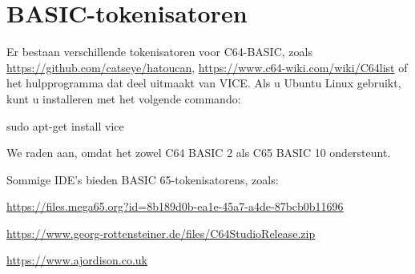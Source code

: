 \chapter{BASIC-tokenisatoren}

Er bestaan verschillende tokenisatoren voor C64-BASIC, zoals \url{https://github.com/catseye/hatoucan},
\url{https://www.c64-wiki.com/wiki/C64list} of het hulpprogramma  dat deel uitmaakt van VICE.
Als u Ubuntu Linux gebruikt, kunt u  installeren met het volgende commando:

\begin{screencode}
sudo apt-get install vice
\end{screencode}

We raden  aan, omdat het zowel C64 BASIC 2 als C65 BASIC 10 ondersteunt.

Sommige IDE's bieden BASIC 65-tokenisatorens, zoals:


\url{https://files.mega65.org?id=8b189d0b-ea1e-45a7-a4de-87bcb0b11696}


\url{https://www.georg-rottensteiner.de/files/C64StudioRelease.zip}


\url{https://www.ajordison.co.uk}
